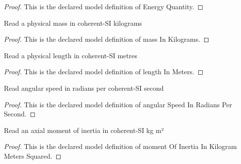 \begin{proof}
  This is the declared model definition of Energy Quantity.
\end{proof}
\begin{definition}
  \label{def:physics:phyx-mini-0819:phyxminiproblems-problemphyxmini0819-massinkilograms}
  Read a physical mass in coherent-SI kilograms
\end{definition}
\begin{proof}
  This is the declared model definition of mass In Kilograms.
\end{proof}
\begin{definition}
  \label{def:physics:phyx-mini-0819:phyxminiproblems-problemphyxmini0819-lengthinmeters}
  Read a physical length in coherent-SI metres
\end{definition}
\begin{proof}
  This is the declared model definition of length In Meters.
\end{proof}
\begin{definition}
  \label{def:physics:phyx-mini-0819:phyxminiproblems-problemphyxmini0819-angularspeedinradianspersecond}
  Read angular speed in radians per coherent-SI second
\end{definition}
\begin{proof}
  This is the declared model definition of angular Speed In Radians Per Second.
\end{proof}
\begin{definition}
  \label{def:physics:phyx-mini-0819:phyxminiproblems-problemphyxmini0819-momentofinertiainkilogrammeterssquared}
  Read an axial moment of inertia in coherent-SI kg m²
\end{definition}
\begin{proof}
  This is the declared model definition of moment Of Inertia In Kilogram Meters Squared.
\end{proof}

